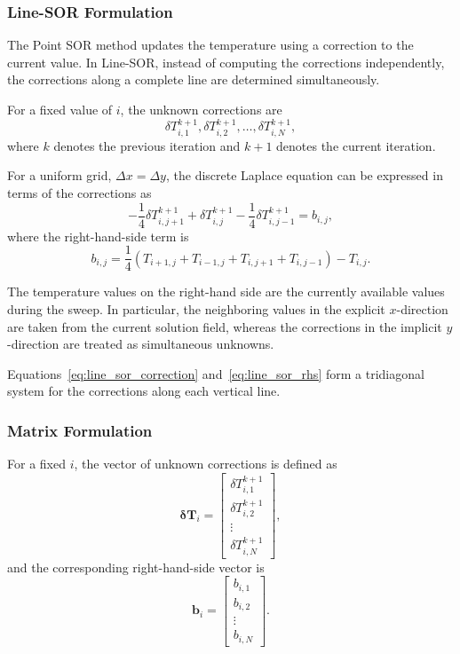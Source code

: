 
\subsubsection{Line-SOR Formulation}

The Point SOR method updates the temperature using a correction to the current value. In Line-SOR, instead of computing the corrections independently, the corrections along a complete line are determined simultaneously.

For a fixed value of $i$, the unknown corrections are
\[
\delta T_{i,1}^{k+1},
\delta T_{i,2}^{k+1},
\ldots,
\delta T_{i,N}^{k+1},
\]
where $k$ denotes the previous iteration and $k+1$ denotes the current iteration.

For a uniform grid, $\Delta x=\Delta y$, the discrete Laplace equation can be expressed in terms of the corrections as
\begin{equation}
-\frac{1}{4}\delta T_{i,j+1}^{k+1}
+
\delta T_{i,j}^{k+1}
-
\frac{1}{4}\delta T_{i,j-1}^{k+1}
=
b_{i,j},
\label{eq:line_sor_correction}
\end{equation}
where the right-hand-side term is
\begin{equation}
b_{i,j}
=
\frac{1}{4}
\left(
T_{i+1,j}
+
T_{i-1,j}
+
T_{i,j+1}
+
T_{i,j-1}
\right)
-
T_{i,j}.
\label{eq:line_sor_rhs}
\end{equation}

The temperature values on the right-hand side are the currently available values during the sweep. In particular, the neighboring values in the explicit $x$-direction are taken from the current solution field, whereas the corrections in the implicit $y$-direction are treated as simultaneous unknowns.

Equations~\ref{eq:line_sor_correction} and~\ref{eq:line_sor_rhs} form a tridiagonal system for the corrections along each vertical line.


\subsubsection{Matrix Formulation}

For a fixed $i$, the vector of unknown corrections is defined as
\begin{equation}
\boldsymbol{\delta T}_i
=
\begin{bmatrix}
\delta T_{i,1}^{k+1}\\
\delta T_{i,2}^{k+1}\\
\vdots\\
\delta T_{i,N}^{k+1}
\end{bmatrix},
\end{equation}
and the corresponding right-hand-side vector is
\begin{equation}
\mathbf{b}_i
=
\begin{bmatrix}
b_{i,1}\\
b_{i,2}\\
\vdots\\
b_{i,N}
\end{bmatrix}.
\end{equation}


